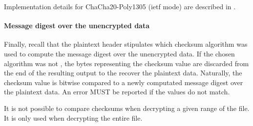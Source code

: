 Implementation details for ChaCha20-Poly1305 (ietf mode) are described in \cite{RFC8439}.

\paragraph{Message digest over the unencrypted data}%
Finally, recall that the plaintext header stipulates which checksum algorithm was used to compute the message digest over the unencrypted data. If the chosen algorithm was not , the bytes representing the checksum value are discarded from the end of the resulting output to the recover the plaintext data.
% 
Naturally, the checksum value is bitwise compared to a newly computated message digest over the plaintext data. An error MUST be reported if the values do not match.

It is not possible to compare checksums when decrypting a given range of the file. It is only used when decrypting the entire file.
